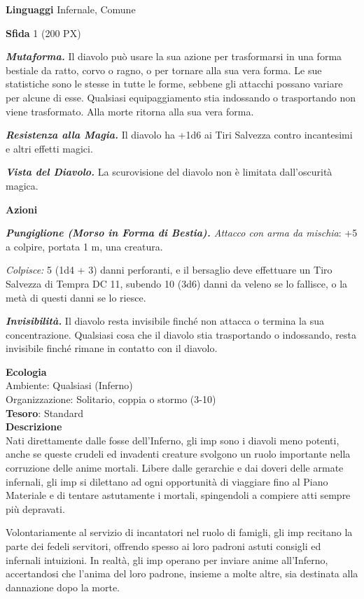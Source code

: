\begin{multicols}{2}
	\textbf{Linguaggi} Infernale, Comune

	\textbf{Sfida} 1 (200 PX)

	\textit{\textbf{Mutaforma.}} Il diavolo può usare la sua azione per trasformarsi in una forma bestiale da ratto, corvo o ragno, o per tornare alla sua vera forma. Le sue statistiche sono le stesse in tutte le forme, sebbene gli attacchi possano variare per alcune di esse. Qualsiasi equipaggiamento stia indossando o trasportando non viene trasformato. Alla morte ritorna alla sua vera forma.

	\textit{\textbf{Resistenza alla Magia.}} Il diavolo ha +1d6 ai Tiri Salvezza contro incantesimi e altri effetti magici.

	\textit{\textbf{Vista del Diavolo.}} La scurovisione del diavolo non è limitata dall'oscurità magica.

	\textbf{Azioni}

	\textit{\textbf{Pungiglione (Morso in Forma di Bestia).} Attacco con arma da mischia}: +5 a colpire, portata 1 m, una creatura.

	\textit{Colpisce:} 5 (1d4 + 3) danni perforanti, e il bersaglio deve effettuare un Tiro Salvezza di Tempra DC 11, subendo 10 (3d6) danni da veleno se lo fallisce, o la metà di questi danni se lo riesce.

	\textit{\textbf{Invisibilità.}} Il diavolo resta invisibile finché non attacca o termina la sua concentrazione. Qualsiasi cosa che il diavolo stia trasportando o indossando, resta invisibile finché rimane in contatto con il diavolo.

	\textbf{Ecologia}\\
	Ambiente: Qualsiasi (Inferno)\\
	Organizzazione: Solitario, coppia o stormo (3-10)\\
	\textbf{Tesoro}: Standard\\
	\textbf{Descrizione}\\
	Nati direttamente dalle fosse dell'Inferno, gli imp sono i diavoli meno potenti, anche se queste crudeli ed invadenti creature svolgono un ruolo importante nella corruzione delle anime mortali. Libere dalle gerarchie e dai doveri delle armate infernali, gli imp si dilettano ad ogni opportunità di viaggiare fino al Piano Materiale e di tentare astutamente i mortali, spingendoli a compiere atti sempre più depravati.

	Volontariamente al servizio di incantatori nel ruolo di famigli, gli imp recitano la parte dei fedeli servitori, offrendo spesso ai loro padroni astuti consigli ed infernali intuizioni. In realtà, gli imp operano per inviare anime all'Inferno, accertandosi che l'anima del loro padrone, insieme a molte altre, sia destinata alla dannazione dopo la morte.


\end{multicols}

